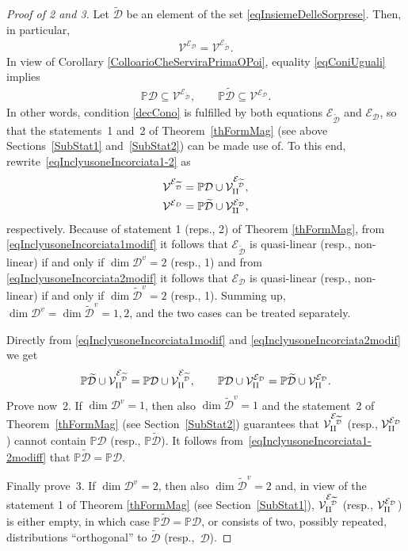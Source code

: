 \documentclass[pdftex]{sigma}
\newcommand{\D}{\mathcal{D}}
\newcommand{\M}{\mathcal{V}}
\newcommand{\MMM}{\mathcal{V}_{\textrm{\normalfont II}}}
\newcommand{\E}{\mathcal{E}}
\renewcommand{\P}{\mathbb{P}}
\numberwithin{equation}{section}
\begin{document}
\begin{proof}[Proof of 2 and 3]
 Let $\widetilde{\D}$ be an element of the set \eqref{eqInsiemeDelleSorprese}. Then, in particular,
 \begin{gather}\label{eqConiUguali}
\M^{\E_\D}=\M^{\E_{\widetilde{\D}}}.
\end{gather}
In view of Corollary \ref{ColloarioCheServiraPrimaOPoi}, equality \eqref{eqConiUguali} implies
 \begin{gather}\label{eqInclyusoneIncorciata1-2}
\P\D \subseteq \M^{\E_{\widetilde{\D}}},\qquad %
\P\widetilde{\D} \subseteq \M^{\E_{\D}}. %
\end{gather}
In other words, condition \eqref{decCono} is fulf\/illed by both equations $\E_{\widetilde{\D}}$ and $ \E_\D$, so that the statements~1 and~2 of Theorem~\ref{thFormMag} (see above Sections~\ref{SubStat1} and~\ref{SubStat2}) can be made use of. To this end, rewrite~\eqref{eqInclyusoneIncorciata1-2} as
 \begin{gather}
 \M^{\E_{\widetilde{\D}}} = \P\D \cup \MMM^{\E_{\widetilde{\D}}},\label{eqInclyusoneIncorciata1modif}\\
 \M^{\E_{D}} = \P\widetilde{\D} \cup \MMM^{\E_{{\D}}},\label{eqInclyusoneIncorciata2modif}
\end{gather}
respectively.
Because of statement 1 (reps., 2) of Theorem \ref{thFormMag}, from \eqref{eqInclyusoneIncorciata1modif} it follows that $\E_{\widetilde{\D}}$ is quasi-linear (resp., non-linear) if and only if $\dim\D^v=2$ (resp., 1) and from \eqref{eqInclyusoneIncorciata2modif} it follows that $\E_{\D}$ is quasi-linear (resp., non-linear) if and only if $\dim{\widetilde{\D}}^v=2$ (resp., 1). Summing up, $\dim \D^v=\dim\widetilde{\D}^v=1,2 $, and the two cases can be treated separately.

Directly from \eqref{eqInclyusoneIncorciata1modif} and \eqref{eqInclyusoneIncorciata2modif} we get
 \begin{gather}\label{eqInclyusoneIncorciata1-2modiff}
\P\widetilde{\D} \cup \MMM^{\E_{\widetilde{\D}}} = \P\D \cup \MMM^{\E_{\widetilde{\D}}},\qquad %
\P {\D} \cup \MMM^{\E_{ {\D}}} = \P\widetilde{\D} \cup \MMM^{\E_{{\D}}}. %
\end{gather}
Prove now~2. If $\dim \D^v=1$, then also $\dim\widetilde{\D}^v=1$ and the statement~2 of Theorem~\ref{thFormMag} (see
Section~\ref{SubStat2}) guarantees that $\MMM^{\E_{\widetilde{\D}}}$ (resp., $\MMM^{\E_{{\D}}}$) cannot contain $\P\D$ (resp., $\P\widetilde{\D}$). It follows from~\eqref{eqInclyusoneIncorciata1-2modiff} that $\P\widetilde{\D}=\P\D$.

Finally prove~3. If $\dim \D^v=2$, then also $\dim\widetilde{\D}^v=2$ and, in view of the statement 1 of Theorem \ref{thFormMag} (see
Section~\ref{SubStat1}), $\MMM^{\E_{\widetilde{\D}}}$ (resp., $\MMM^{\E_{{\D}}}$) is either empty, in which case $\P\widetilde{\D}=\P\D$, or consists of two, possibly repeated, distributions ``orthogonal'' to $\widetilde{\D}$ (resp.,~$\D$).
\end{proof}
\end{document}
